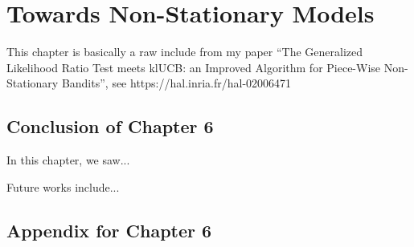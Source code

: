 

\chapter{Towards Non-Stationary Models}
\label{chapter:6}
\minitoc
\newpage
\graphicspath{{2-Chapters/6-Chapter/Images/}}

This chapter is basically a raw include from my paper ``The Generalized Likelihood Ratio Test meets klUCB: an Improved Algorithm for Piece-Wise Non-Stationary Bandits'', see https://hal.inria.fr/hal-02006471




\section{Conclusion of Chapter 6}
\label{sec:6:conclusion}

In this chapter, we saw...

Future works include...



\section{Appendix for Chapter 6}
\label{sec:6:appendix}


